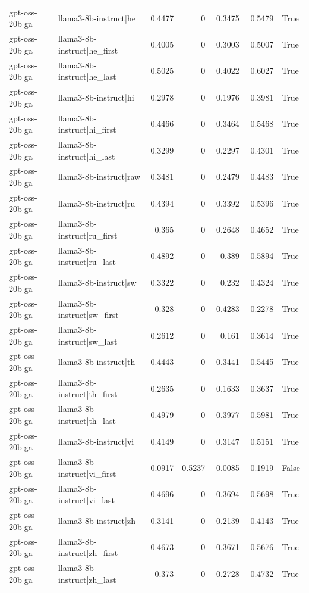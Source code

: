 \begin{table}
\begin{tabular}{l l r r r r l}
gpt-oss-20b|ga & llama3-8b-instruct|he & 0.4477 & 0 & 0.3475 & 0.5479 & True \\
gpt-oss-20b|ga & llama3-8b-instruct|he_first & 0.4005 & 0 & 0.3003 & 0.5007 & True \\
gpt-oss-20b|ga & llama3-8b-instruct|he_last & 0.5025 & 0 & 0.4022 & 0.6027 & True \\
gpt-oss-20b|ga & llama3-8b-instruct|hi & 0.2978 & 0 & 0.1976 & 0.3981 & True \\
gpt-oss-20b|ga & llama3-8b-instruct|hi_first & 0.4466 & 0 & 0.3464 & 0.5468 & True \\
gpt-oss-20b|ga & llama3-8b-instruct|hi_last & 0.3299 & 0 & 0.2297 & 0.4301 & True \\
gpt-oss-20b|ga & llama3-8b-instruct|raw & 0.3481 & 0 & 0.2479 & 0.4483 & True \\
gpt-oss-20b|ga & llama3-8b-instruct|ru & 0.4394 & 0 & 0.3392 & 0.5396 & True \\
gpt-oss-20b|ga & llama3-8b-instruct|ru_first & 0.365 & 0 & 0.2648 & 0.4652 & True \\
gpt-oss-20b|ga & llama3-8b-instruct|ru_last & 0.4892 & 0 & 0.389 & 0.5894 & True \\
gpt-oss-20b|ga & llama3-8b-instruct|sw & 0.3322 & 0 & 0.232 & 0.4324 & True \\
gpt-oss-20b|ga & llama3-8b-instruct|sw_first & -0.328 & 0 & -0.4283 & -0.2278 & True \\
gpt-oss-20b|ga & llama3-8b-instruct|sw_last & 0.2612 & 0 & 0.161 & 0.3614 & True \\
gpt-oss-20b|ga & llama3-8b-instruct|th & 0.4443 & 0 & 0.3441 & 0.5445 & True \\
gpt-oss-20b|ga & llama3-8b-instruct|th_first & 0.2635 & 0 & 0.1633 & 0.3637 & True \\
gpt-oss-20b|ga & llama3-8b-instruct|th_last & 0.4979 & 0 & 0.3977 & 0.5981 & True \\
gpt-oss-20b|ga & llama3-8b-instruct|vi & 0.4149 & 0 & 0.3147 & 0.5151 & True \\
gpt-oss-20b|ga & llama3-8b-instruct|vi_first & 0.0917 & 0.5237 & -0.0085 & 0.1919 & False \\
gpt-oss-20b|ga & llama3-8b-instruct|vi_last & 0.4696 & 0 & 0.3694 & 0.5698 & True \\
gpt-oss-20b|ga & llama3-8b-instruct|zh & 0.3141 & 0 & 0.2139 & 0.4143 & True \\
gpt-oss-20b|ga & llama3-8b-instruct|zh_first & 0.4673 & 0 & 0.3671 & 0.5676 & True \\
gpt-oss-20b|ga & llama3-8b-instruct|zh_last & 0.373 & 0 & 0.2728 & 0.4732 & True \\

\end{tabular}
\end{table}
